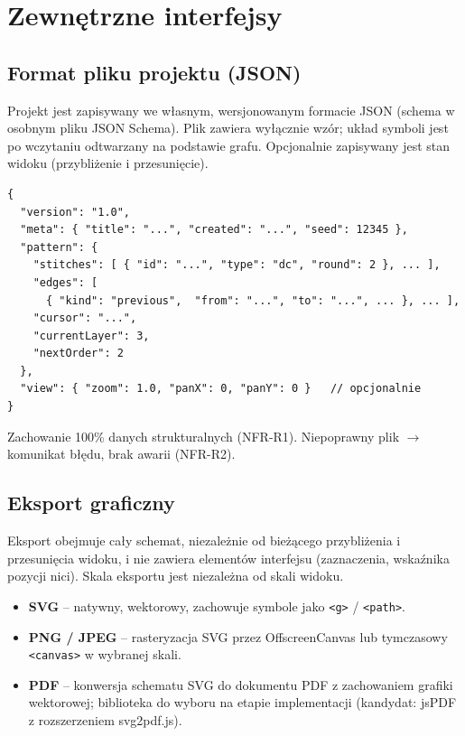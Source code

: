 \documentclass[a4paper,11pt]{article}
\begin{document}
\section{Zewnętrzne interfejsy}

\subsection{Format pliku projektu (JSON)}

Projekt jest zapisywany we własnym, wersjonowanym formacie JSON (schema w osobnym pliku JSON Schema). Plik zawiera wyłącznie wzór; układ symboli jest po wczytaniu odtwarzany na podstawie grafu. Opcjonalnie zapisywany jest stan widoku (przybliżenie i przesunięcie).

\begin{verbatim}
{
  "version": "1.0",
  "meta": { "title": "...", "created": "...", "seed": 12345 },
  "pattern": {
    "stitches": [ { "id": "...", "type": "dc", "round": 2 }, ... ],
    "edges": [
      { "kind": "previous",  "from": "...", "to": "...", ... }, ... ],
    "cursor": "...",
    "currentLayer": 3,
    "nextOrder": 2
  },
  "view": { "zoom": 1.0, "panX": 0, "panY": 0 }   // opcjonalnie
}
\end{verbatim}

Zachowanie 100\% danych strukturalnych (NFR-R1). Niepoprawny plik $\to$ komunikat błędu, brak awarii (NFR-R2).

\subsection{Eksport graficzny}

Eksport obejmuje cały schemat, niezależnie od bieżącego przybliżenia i przesunięcia widoku, i nie zawiera elementów interfejsu (zaznaczenia, wskaźnika pozycji nici). Skala eksportu jest niezależna od skali widoku.

\begin{itemize}
  \item \textbf{SVG} -- natywny, wektorowy, zachowuje symbole jako \texttt{<g>} / \texttt{<path>}.
  \item \textbf{PNG / JPEG} -- rasteryzacja SVG przez OffscreenCanvas lub tymczasowy \texttt{<canvas>} w wybranej skali.
  \item \textbf{PDF} -- konwersja schematu SVG do dokumentu PDF z zachowaniem grafiki wektorowej; biblioteka do wyboru na etapie implementacji (kandydat: jsPDF z rozszerzeniem svg2pdf.js).
\end{itemize}
\end{document}
